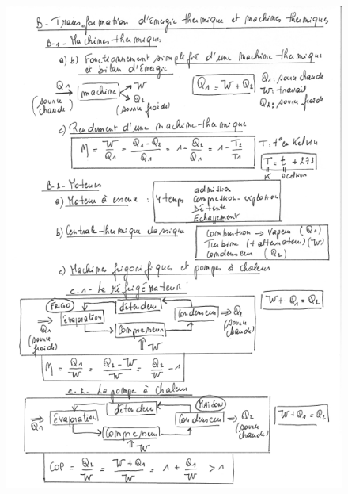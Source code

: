 \begin{figure}
\centering
\includegraphics[width=19.143cm,height=27.376cm]{Pictures/10000001000002440000033EFBA46FA2D90A9FB6.png}
\caption{}
\end{figure}
